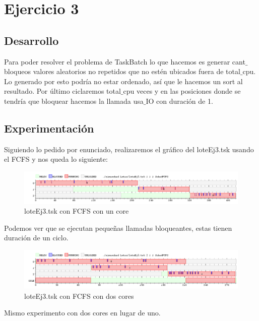 
\section{Ejercicio 3}

\subsection{Desarrollo}
Para poder resolver el problema de TaskBatch lo que hacemos es generar cant$\_$bloqueos valores aleatorios no repetidos que no estén ubicados fuera de total$\_$cpu. 
Lo generado por esto podría no estar ordenado, así que le hacemos un sort al resultado. Por último ciclaremos total$\_$cpu veces y en las posiciones donde se tendría que 
bloquear hacemos la llamada usa$\_$IO con duración de 1.

\subsection{Experimentación}
Siguiendo lo pedido por enunciado, realizaremos el gráfico del loteEj3.tsk usando el FCFS y nos queda lo siguiente:

\begin{figure}[H]
  \centering
    \includegraphics[width=1.1\textwidth]{imagenes/BatchExperimento.png}
  \caption{loteEj3.tsk con FCFS con un core}
\end{figure}

Podemos ver que se ejecutan pequeñas llamadas bloqueantes, estas tienen duración de un ciclo. 

\begin{figure}[H]
  \centering
    \includegraphics[width=1.1\textwidth]{imagenes/BatchExperimento2cores.png}
  \caption{loteEj3.tsk con FCFS con dos cores}
\end{figure}

Mismo experimento con dos cores en lugar de uno.